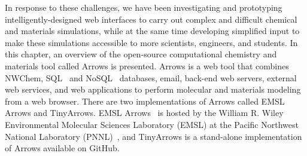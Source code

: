 \documentclass[runningheads,a4paper]{llncs}
\begin{document}
In response to these challenges, we have been investigating and prototyping intelligently-designed web interfaces to carry out complex and difficult chemical and materials simulations, while at the same time developing simplified input to make these simulations accessible to more scientists, engineers, and students.  In this chapter, an overview of the open-source computational chemistry and materials tool called Arrows is presented.  Arrows is a web tool that combines NWChem, SQL~\cite{chamberlin1974sequel,hursch1988sql} and NoSQL~\cite{stonebraker2010sql} databases, email, back-end web servers, external web services, and web applications to perform molecular and materials modeling from a web browser. There are two implementations of Arrows called EMSL Arrows and TinyArrows.  EMSL Arrows~\cite{emslArrows} is hosted by the William R. Wiley Environmental Molecular Sciences Laboratory (EMSL) at the Pacific Northwest National Laboratory (PNNL)~\cite{foster2005environmental,emslpnnl}, and TinyArrows is a stand-alone implementation of Arrows available on GitHub.
\end{document}
